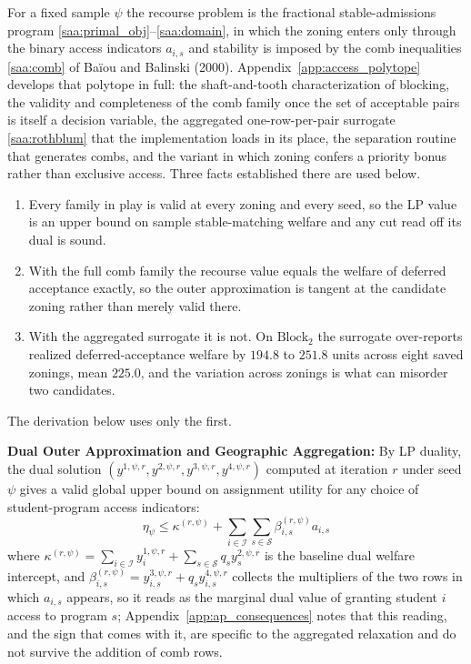 \documentclass{article}
\begin{document}
For a fixed sample $\psi$ the recourse problem is the fractional stable-admissions program \eqref{saa:primal_obj}--\eqref{saa:domain}, in which the zoning enters only through the binary access indicators $a_{i,s}$ and stability is imposed by the comb inequalities \eqref{saa:comb} of Baïou and Balinski (2000). Appendix~\ref{app:access_polytope} develops that polytope in full: the shaft-and-tooth characterization of blocking, the validity and completeness of the comb family once the set of acceptable pairs is itself a decision variable, the aggregated one-row-per-pair surrogate \eqref{saa:rothblum} that the implementation loads in its place, the separation routine that generates combs, and the variant in which zoning confers a priority bonus rather than exclusive access. Three facts established there are used below.
\begin{enumerate}
    \item Every family in play is valid at every zoning and every seed, so the LP value is an upper bound on sample stable-matching welfare and any cut read off its dual is sound.
    \item With the full comb family the recourse value equals the welfare of deferred acceptance exactly, so the outer approximation is tangent at the candidate zoning rather than merely valid there.
    \item With the aggregated surrogate it is not. On $\text{Block}_2$ the surrogate over-reports realized deferred-acceptance welfare by $194.8$ to $251.8$ units across eight saved zonings, mean $225.0$, and the variation across zonings is what can misorder two candidates.
\end{enumerate}
The derivation below uses only the first.

\noindent\textbf{Dual Outer Approximation and Geographic Aggregation:}
By LP duality, the dual solution $(y^{1,\psi, r}, y^{2,\psi, r}, y^{3,\psi, r}, y^{4,\psi, r})$ computed at iteration $r$ under seed $\psi$ gives a valid global upper bound on assignment utility for any choice of student-program access indicators:
\begin{equation}
\eta_\psi \leq \kappa^{(r, \psi)} + \sum_{i \in \mathcal{I}} \sum_{s \in \mathcal{S}} \beta_{i,s}^{(r, \psi)} a_{i,s}
\end{equation}
where $\kappa^{(r, \psi)} = \sum_{i \in \mathcal{I}} y_i^{1,\psi, r} + \sum_{s \in \mathcal{S}} q_s y_s^{2,\psi, r}$ is the baseline dual welfare intercept, and $\beta_{i,s}^{(r, \psi)} = y_{i,s}^{3,\psi, r} + q_s y_{i,s}^{4,\psi, r}$ collects the multipliers of the two rows in which $a_{i,s}$ appears, so it reads as the marginal dual value of granting student $i$ access to program $s$; Appendix~\ref{app:ap_consequences} notes that this reading, and the sign that comes with it, are specific to the aggregated relaxation and do not survive the addition of comb rows.
\end{document}
